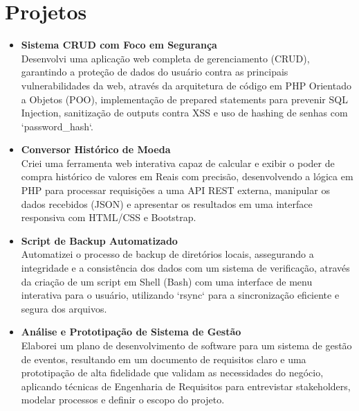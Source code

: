 \documentclass[a4paper,12pt]{article}
\begin{document}

\section*{Projetos}
\begin{itemize}[noitemsep, nolistsep, leftmargin=*, itemsep=8pt]
    \item 
        \textbf{Sistema CRUD com Foco em Segurança} \\
        Desenvolvi uma aplicação web completa de gerenciamento (CRUD), garantindo a proteção de dados do usuário contra as principais vulnerabilidades da web, através da arquitetura de código em PHP Orientado a Objetos (POO), implementação de prepared statements para prevenir SQL Injection, sanitização de outputs contra XSS e uso de hashing de senhas com `password_hash`.

    \item 
        \textbf{Conversor Histórico de Moeda} \\
        Criei uma ferramenta web interativa capaz de calcular e exibir o poder de compra histórico de valores em Reais com precisão, desenvolvendo a lógica em PHP para processar requisições a uma API REST externa, manipular os dados recebidos (JSON) e apresentar os resultados em uma interface responsiva com HTML/CSS e Bootstrap.

    \item 
        \textbf{Script de Backup Automatizado} \\
        Automatizei o processo de backup de diretórios locais, assegurando a integridade e a consistência dos dados com um sistema de verificação, através da criação de um script em Shell (Bash) com uma interface de menu interativa para o usuário, utilizando `rsync` para a sincronização eficiente e segura dos arquivos.
        
    \item 
        \textbf{Análise e Prototipação de Sistema de Gestão} \\
        Elaborei um plano de desenvolvimento de software para um sistema de gestão de eventos, resultando em um documento de requisitos claro e uma prototipação de alta fidelidade que validam as necessidades do negócio, aplicando técnicas de Engenharia de Requisitos para entrevistar stakeholders, modelar processos e definir o escopo do projeto.
\end{itemize}
\end{document}
